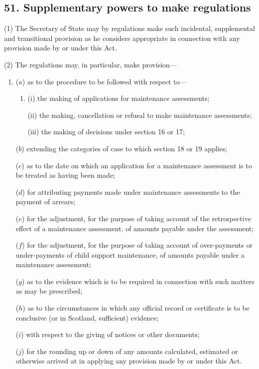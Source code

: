 \documentclass[12pt,a4paper]{article}
\begin{document}
\subsection{51. Supplementary powers to make regulations}

(1) The Secretary of State may by regulations make such incidental, supplemental and transitional provision as he considers appropriate in connection with any provision made by or under this Act.

(2) The regulations may, in particular, make provision—
\begin{enumerate}\item[]
($a$) as to the procedure to be followed with respect to—
\begin{enumerate}\item[]
(i) the making of applications for maintenance assessments;

(ii) the making, cancellation or refusal to make maintenance assessments;


(iii) the making of decisions under section 16 or 17;
\end{enumerate}

($b$) extending the categories of case to which 
section 18 or 19 
applies;

($c$) as to the date on which an application for a maintenance assessment is to be treated as having been made;

($d$) for attributing payments made under maintenance assessments to the payment of arrears;

($e$) for the adjustment, for the purpose of taking account of the retrospective effect of a maintenance assessment, of amounts payable under the assessment;

($f$) for the adjustment, for the purpose of taking account of over-payments or under-payments of child support maintenance, of amounts payable under a maintenance assessment;

($g$) as to the evidence which is to be required in connection with such matters as may be prescribed;

($h$) as to the circumstances in which any official record or certificate is to be conclusive (or in Scotland, sufficient) evidence;

($i$) with respect to the giving of notices or other documents;

($j$) for the rounding up or down of any amounts calculated, estimated or otherwise arrived at in applying any provision made by or under this Act.
\end{enumerate}
\end{document}

